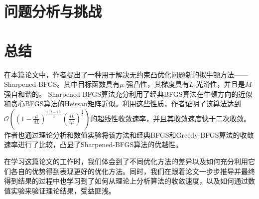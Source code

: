 \documentclass[a4paper,twoside,AutoFakeBold]{article}
\theoremstyle{definition}
\begin{document}
%
\section{问题分析与挑战}\label{section:problem}

%
\section{总结}\label{section:conclusion}
在本篇论文中，作者提出了一种用于解决无约束凸优化问题新的拟牛顿方法——Sharpened-BFGS。其中目标函数具有$\mu$-强凸性，其梯度具有$L$-光滑性，并且是$M$-强自和谐的。
Sharpened-BFGS算法充分利用了经典BFGS算法在牛顿方向的近似和贪心BFGS算法的Heissan矩阵近似。利用这些性质，作者证明了该算法达到$\mathcal{O}((1 - \frac{\mu}{dL})^{\frac{t(t - 1)}{4}} (\frac{dL}{t\mu})^{\frac{t}{2}})$的超线性收敛速率，并且其收敛速度快于二次收敛。
作者也通过理论分析和数值实验将该方法和经典BFGS和Greedy-BFGS算法的收敛速率进行了比较，凸显了Sharpened-BFGS算法的优越性。

在学习这篇论文的工作时，我们体会到了不同优化方法的差异以及如何充分利用它们各自的优势得到表现更好的优化方法。同时，我们在跟着论文一步步推导并最终得到结果的过程中也学习到了如何从理论上分析算法的收敛速度，以及如何通过数值实验来验证理论结果，受益匪浅。




\end{document}

